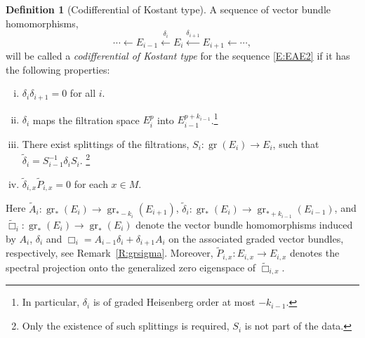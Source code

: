 \documentclass[reqno,12pt]{amsart}
\DeclareMathOperator{\gr}{gr}
\theoremstyle{plain}
\theoremstyle{definition}
\newtheorem{definition}[theorem]{Definition}
\begin{document}
\begin{definition}[Codifferential of Kostant type]\label{D:Kdelta}
A sequence of vector bundle homomorphisms,
\begin{equation}\label{E:admEdelE}
\cdots\leftarrow E_{i-1}\xleftarrow{\delta_i}E_i\xleftarrow{\delta_{i+1}}E_{i+1}\leftarrow\cdots,
\end{equation}
will be called a \emph{codifferential of Kostant type} for the sequence \eqref{E:EAE2} if it has the following properties:
\begin{enumerate}[(i)]
\item
$\delta_i\delta_{i+1}=0$ for all $i$.
\item
$\delta_i$ maps the filtration space $E_i^p$ into $E_{i-1}^{p+k_{i-1}}$.\footnote{In particular, $\delta_i$ is of graded Heisenberg order at most $-{k_{i-1}}$.}
\item
There exist splittings of the filtrations, $S_i\colon\gr(E_i)\to E_i$, such that $\tilde\delta_i=S_{i-1}^{-1}\delta_iS_i$.
\footnote{Only the existence of such splittings is required, $S_i$ is not part of the data.}
\item
$\tilde\delta_{i,x}\tilde P_{i,x}=0$ for each $x\in M$.
\end{enumerate}
Here $\tilde A_i\colon\gr_*(E_i)\to\gr_{*-k_i}(E_{i+1})$, 
$\tilde\delta_i\colon\gr_*(E_i)\to\gr_{*+k_{i-1}}(E_{i-1})$, and
$\tilde\Box_i\colon\gr_*(E_i)\to\gr_*(E_i)$
denote the vector bundle homomorphisms induced by $A_i$, $\delta_i$ and $\Box_i=A_{i-1}\delta_i+\delta_{i+1}A_i$ on the associated graded vector bundles, respectively, see Remark~\ref{R:grsigma}.
Moreover, $\tilde P_{i,x}\colon E_{i,x}\to E_{i,x}$ denotes the spectral projection onto the generalized zero eigenspace of $\tilde\Box_{i,x}$.
\end{definition}
\end{document}
